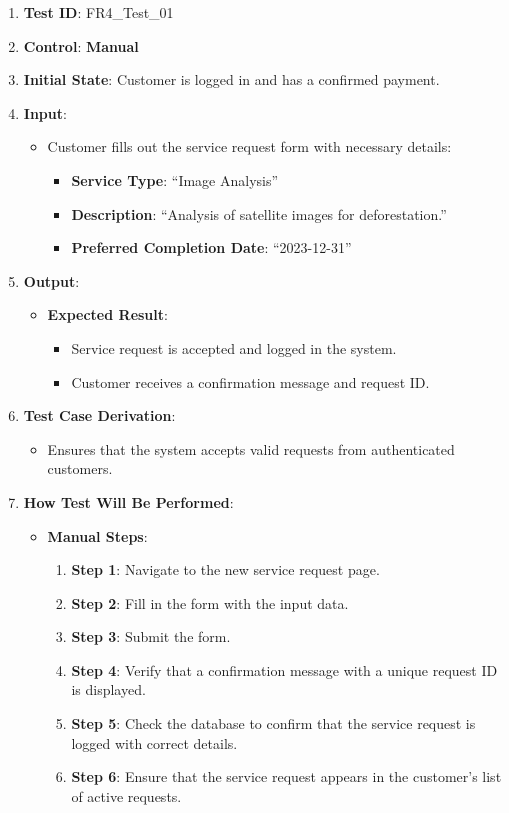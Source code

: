\documentclass[12pt, titlepage]{article}
\begin{document}
\begin{enumerate}
    \item \textbf{Test ID}: FR4\_Test\_01
    \item \textbf{Control}: \textbf{Manual}
    \item \textbf{Initial State}: Customer is logged in and has a confirmed payment.
    \item \textbf{Input}:
    \begin{itemize}
        \item Customer fills out the service request form with necessary details:
        \begin{itemize}
            \item \textbf{Service Type}: ``Image Analysis''
            \item \textbf{Description}: ``Analysis of satellite images for deforestation.''
            \item \textbf{Preferred Completion Date}: ``2023-12-31''
        \end{itemize}
    \end{itemize}
    \item \textbf{Output}:
    \begin{itemize}
        \item \textbf{Expected Result}:
        \begin{itemize}
            \item Service request is accepted and logged in the system.
            \item Customer receives a confirmation message and request ID.
        \end{itemize}
    \end{itemize}
    \item \textbf{Test Case Derivation}:
    \begin{itemize}
        \item Ensures that the system accepts valid requests from authenticated customers.
    \end{itemize}
    \item \textbf{How Test Will Be Performed}:
    \begin{itemize}
        \item \textbf{Manual Steps}:
        \begin{enumerate}
            \item \textbf{Step 1}: Navigate to the new service request page.
            \item \textbf{Step 2}: Fill in the form with the input data.
            \item \textbf{Step 3}: Submit the form.
            \item \textbf{Step 4}: Verify that a confirmation message with a unique request ID is displayed.
            \item \textbf{Step 5}: Check the database to confirm that the service request is logged with correct details.
            \item \textbf{Step 6}: Ensure that the service request appears in the customer's list of active requests.
        \end{enumerate}
    \end{itemize}
\end{enumerate}
\end{document}
